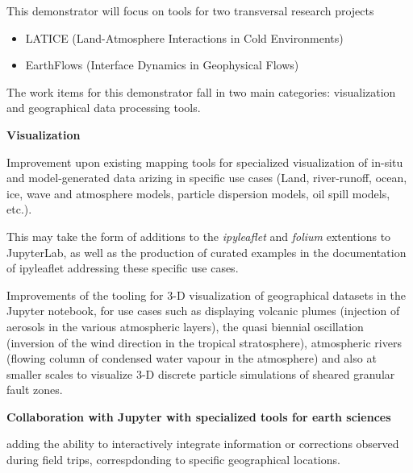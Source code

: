 \begin{task}[
  title=Geosciences application,
  id=geoscience,
  lead=UIO,
  PM=24,
  wphases={0-48},
  partners={UIO,QS,SRL}
]
This demonstrator will focus on tools for two transversal research projects

\begin{itemize}
\item LATICE (Land-Atmosphere Interactions in Cold Environments)
\item EarthFlows (Interface Dynamics in Geophysical Flows)
\end{itemize}

The work items for this demonstrator fall in two main categories:
visualization and geographical data processing tools.

\textbf{Visualization}

  \begin{compactitem}
  \item Improvement upon existing mapping tools for specialized
    visualization of in-situ and model-generated data arizing in
    specific use cases (Land, river-runoff, ocean, ice, wave and
    atmosphere models, particle dispersion models, oil spill models,
    etc.).

    This may take the form of additions to the \emph{ipyleaflet} and
    \emph{folium} extentions to JupyterLab, as well as the production of
    curated examples in the documentation of ipyleaflet addressing these
    specific use cases.

  \item Improvements of the tooling for 3-D visualization of
    geographical datasets in the Jupyter notebook, for use cases such as
    displaying volcanic plumes (injection of aerosols in the various
    atmospheric layers), the quasi biennial oscillation (inversion of
    the wind direction in the tropical stratosphere), atmospheric rivers
    (flowing column of condensed water vapour in the atmosphere) and
    also at smaller scales to visualize 3-D discrete particle simulations
    of sheared granular fault zones.
 
  \end{compactitem}

\textbf{Collaboration with Jupyter with specialized tools for earth sciences}

\begin{compactitem}

  \item adding the ability to interactively integrate information or corrections
    observed during field trips, correspdonding to specific geographical locations.



\end{compactitem}
\end{task}
